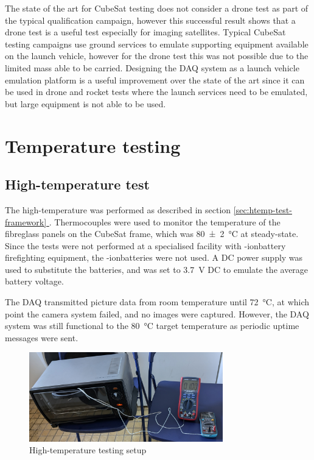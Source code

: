 \documentclass[]{report}
\newcommand*{\secref}[1]{section \hyperref[{#1}]{\ref*{#1} \nameref*{#1}}}
\newcommand{\liion}{\ce{Li}-ion}
\begin{document}
The state of the art for CubeSat testing does not consider a drone test as part of the typical qualification campaign, however this successful result shows that a drone test is a useful test especially for imaging satellites. Typical CubeSat testing campaigns use ground services to emulate supporting equipment available on the launch vehicle, however for the drone test this was not possible due to the limited mass able to be carried. Designing the DAQ system as a launch vehicle emulation platform is a useful improvement over the state of the art since it can be used in drone and rocket tests where the launch services need to be emulated, but large equipment is not able to be used.

\section{Temperature testing}
\subsection{High-temperature test}
The high-temperature was performed as described in \secref{sec:htemp-test-framework}. Thermocouples were used to monitor the temperature of the fibreglass panels on the CubeSat frame, which was \SI{80(2)}{\degreeCelsius} at steady-state. Since the tests were not performed at a specialised facility with \liion battery firefighting equipment, the \liion batteries were not used. A DC power supply was used to substitute the batteries, and was set to \SI{3.7}{\volt} DC to emulate the average battery voltage.

The DAQ transmitted picture data from room temperature until \SI{72}{\degreeCelsius}, at which point the camera system failed, and no images were captured. However, the DAQ system was still functional to the \SI{80}{\degreeCelsius} target temperature as periodic uptime messages were sent.

\begin{figure}[H]
  \centering
  \includegraphics[width=0.75\textwidth]{images/oven_test.jpg}
  \caption{High-temperature testing setup}
  \label{fig:temperature-testing-oven}
\end{figure}
\end{document}
